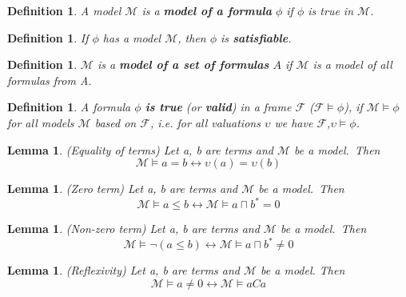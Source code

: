 \documentclass{article}
\newcommand\M{\mathcal{M}}
\newcommand\F{\mathcal{F}}
\newtheorem{lemma}[theorem]{Lemma}
\newtheorem{defn}[theorem]{Definition}
\begin{document}
	\begin{defn}
		A model $\M$ is a \textit{\textbf{model of a formula}} $\phi$ if $\phi$ is \textit{true} in $\M$.
	\end{defn}

	\begin{defn}
		If $\phi$ has a model $\M$, then $\phi$ is \textbf{satisfiable}.
	\end{defn}

	\begin{defn}
		$\M$ is a \textbf{model of a set of formulas} $A$ if $\M$ is a model of all formulas from A.
	\end{defn}

	\begin{defn} A formula $\phi$ \textbf{is \textit{true}} (or \textbf{valid}) in a frame $\F$ ($\F \models \phi$), if $\M \models \phi$ for all models $\M$ based on $\F$, i.e. for all valuations $\upsilon$ we have $\F$,$\upsilon \models \phi$.
	\end{defn}

	\begin{lemma}
		(Equality of terms) Let a, b are terms and $\M$ be a model.~Then
		\begin{equation*}
			\M \models a = b \leftrightarrow \upsilon(a) = \upsilon(b)
		\end{equation*}
	\end{lemma}

	\begin{lemma} (Zero term) Let a, b are terms and $\M$ be a model.~Then
		\begin{equation*}
			\M \models a \leq b \leftrightarrow \M \models a \sqcap b^*=0
		\end{equation*}
	\end{lemma}

	\begin{lemma} (Non-zero term) Let a, b are terms and $\M$ be a model.~Then
		\begin{equation*}
			\M \models \neg(a \leq b) \leftrightarrow \M \models a \sqcap b^* \neq 0
		\end{equation*}
	\end{lemma}

	\begin{lemma}
		(Reflexivity) Let a, b are terms and $\M$ be a model. Then
		\begin{equation*}
			\M \models a \neq 0 \leftrightarrow \M \models aCa
		\end{equation*}
	\end{lemma}
\end{document}
